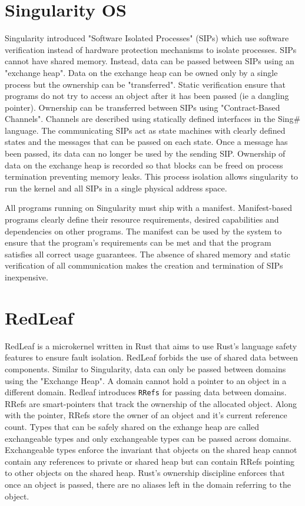 \section{Singularity OS}
Singularity\cite{singularity} introduced "Software Isolated Processes" (SIPs) which use software verification instead of hardware protection mechanisms to isolate processes. SIPs cannot have shared memory. Instead, data can be passed between SIPs using an "exchange heap". Data on the exchange heap can be owned only by a single process but the ownership can be "transferred". Static verification ensure that programs do not try to access an object after it has been passed (ie a dangling pointer). Ownership can be transferred between SIPs using "Contract-Based Channels". Channels are described using statically defined interfaces in the Sing\# language. The communicating SIPs act as state machines with clearly defined states and the messages that can be passed on each state. Once a message has been passed, its data can no longer be used by the sending SIP. Ownership of data on the exchange heap is recorded so that blocks can be freed on process termination preventing memory leaks. This process isolation allows singularity to run the kernel and all SIPs in a single physical address space.

All programs running on Singularity must ship with a manifest. Manifest-based programs clearly define their resource requirements, desired capabilities and dependencies on other programs. The manifest can be used by the system to ensure that the program's requirements can be met and that the program satisfies all correct usage guarantees. The absence of shared memory and static verification of all communication makes the creation and termination of SIPs inexpensive.

\section{RedLeaf}
RedLeaf is a microkernel written in Rust that aims to use Rust's language safety features to ensure fault isolation. RedLeaf forbids the use of shared data between components. Similar to Singularity, data can only be passed between domains using the "Exchange Heap". A domain cannot hold a pointer to an object in a different domain. Redleaf introduces \lstinline{RRefs} for passing data between domains. RRefs are smart-pointers that track the ownership of the allocated object. Along with the pointer, RRefs store the owner of an object and it's current reference count. Types that can be safely shared on the exhange heap are called exchangeable types and only exchangeable types can be passed across domains. Exchangeable types enforce the invariant that objects on the shared heap cannot contain any references to private or shared heap but can contain RRefs pointing to other objects on the shared heap. Rust's ownership discipline enforces that once an object is passed, there are no aliases left in the domain referring to the object. 

